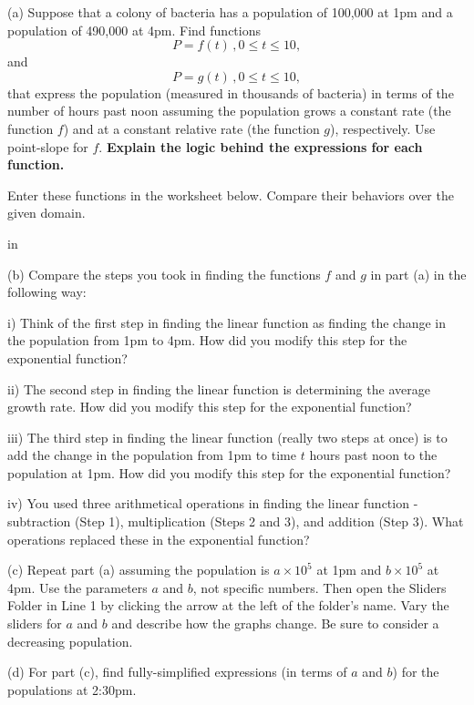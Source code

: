 \documentclass{ximera}
\newcommand{\pskip}{\vskip 0.1 in}
\begin{document}
\begin{question}   \label{Q22:ExponentialG}
(a) Suppose that a colony of bacteria has a population of 100,000 at 1pm and a population of 490,000 at 4pm. Find functions 
\[
   P = f(t) \, , 0\leq t \leq 10 ,
\]
and 
\[
   P = g(t) \, , 0\leq t \leq 10 ,
\]
that express the population (measured in thousands of bacteria) in terms of the number of hours past noon assuming the population grows a constant rate (the function $f$) and at a constant relative rate (the function $g$), respectively. Use point-slope for $f$. {\bf Explain the logic behind the expressions for each function.}

Enter these functions in the worksheet below. Compare their behaviors over the given domain.

 
\begin{onlineOnly}
    \begin{center}
\end{center}
\end{onlineOnly}

\pskip

(b) Compare the steps  you took in finding the functions $f$ and $g$ in part (a) in the following way:

i) Think of the first step in finding the linear function as finding the change in the population from 1pm to 4pm. How did you modify this step for the exponential function?

ii) The second step in finding the linear function is determining the average growth rate. How did you modify this step for the exponential function?

iii) The third step in finding the linear function (really two steps at once) is to add the change in the population from 1pm to time $t$ hours past noon to the population at 1pm. How did you modify this step for the exponential function?

iv) You used three arithmetical operations in finding the linear function - subtraction (Step 1), multiplication (Steps 2 and 3), and addition (Step 3). What operations replaced these in the exponential function?



(c) Repeat part (a) assuming the population is $a\times 10^5$ at 1pm and $b\times 10^5$ at 4pm. Use the parameters $a$ and $b$, not specific numbers. Then open the Sliders Folder in Line 1 by clicking the arrow at the left of the folder's name. Vary the sliders for $a$ and $b$ and describe how the graphs change. Be sure to consider a decreasing population.


(d) For part (c), find fully-simplified expressions (in terms of $a$ and $b$) for the populations at 2:30pm.

\end{question}
\end{document}
